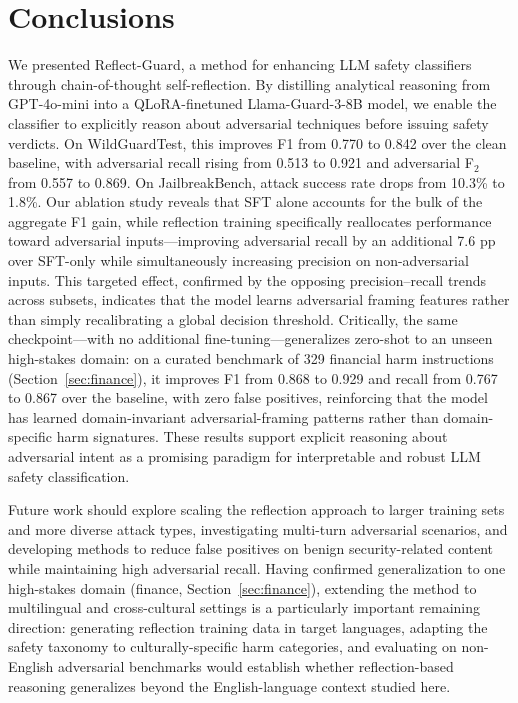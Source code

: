 \documentclass[Superintelligence,article,submit,pdftex,moreauthors]{Definitions/mdpi}
\begin{document}
\section{Conclusions}

We presented Reflect-Guard, a method for enhancing LLM safety classifiers through chain-of-thought self-reflection. By distilling analytical reasoning from GPT-4o-mini into a QLoRA-finetuned Llama-Guard-3-8B model, we enable the classifier to explicitly reason about adversarial techniques before issuing safety verdicts. On WildGuardTest, this improves F1 from 0.770 to 0.842 over the clean baseline, with adversarial recall rising from 0.513 to 0.921 and adversarial F$_2$ from 0.557 to 0.869. On JailbreakBench, attack success rate drops from 10.3\% to 1.8\%. Our ablation study reveals that SFT alone accounts for the bulk of the aggregate F1 gain, while reflection training specifically reallocates performance toward adversarial inputs---improving adversarial recall by an additional 7.6 pp over SFT-only while simultaneously increasing precision on non-adversarial inputs. This targeted effect, confirmed by the opposing precision--recall trends across subsets, indicates that the model learns adversarial framing features rather than simply recalibrating a global decision threshold. Critically, the same checkpoint---with no additional fine-tuning---generalizes zero-shot to an unseen high-stakes domain: on a curated benchmark of 329 financial harm instructions (Section~\ref{sec:finance}), it improves F1 from 0.868 to 0.929 and recall from 0.767 to 0.867 over the baseline, with zero false positives, reinforcing that the model has learned domain-invariant adversarial-framing patterns rather than domain-specific harm signatures. These results support explicit reasoning about adversarial intent as a promising paradigm for interpretable and robust LLM safety classification.

Future work should explore scaling the reflection approach to larger training sets and more diverse attack types, investigating multi-turn adversarial scenarios, and developing methods to reduce false positives on benign security-related content while maintaining high adversarial recall. Having confirmed generalization to one high-stakes domain (finance, Section~\ref{sec:finance}), extending the method to multilingual and cross-cultural settings is a particularly important remaining direction: generating reflection training data in target languages, adapting the safety taxonomy to culturally-specific harm categories, and evaluating on non-English adversarial benchmarks would establish whether reflection-based reasoning generalizes beyond the English-language context studied here.
\end{document}
